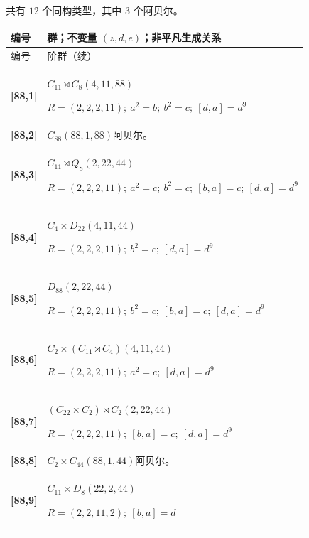 \documentclass[UTF8,fontset=fandol,11pt,a4paper]{ctexart}
\begin{document}
共有 $12$ 个同构类型，其中 $3$ 个阿贝尔。

\begingroup\small\setlength{\tabcolsep}{3pt}\renewcommand{\arraystretch}{1.12}

\begin{longtable}{@{}p{17mm}>{\raggedright\arraybackslash}p{141mm}@{}}

\toprule 编号 & 群；不变量 $(z,d,e)$；非平凡生成关系\\\midrule\endfirsthead

\toprule 编号 & 88 阶群（续）\\\midrule\endhead\bottomrule\endfoot

\textbf{[88,1]} & $C_{11}\rtimes C_{8}$\quad $(4,11,88)$\par\(R=(2,2,2,11);\allowbreak\ a^{2}=b;\allowbreak\ b^{2}=c;\allowbreak\ [d,a]=d^{9}\)\\[3pt]

\textbf{[88,2]} & $C_{88}$\quad $(88,1,88)$\quad 阿贝尔。\\[3pt]

\textbf{[88,3]} & $C_{11}\rtimes Q_{8}$\quad $(2,22,44)$\par\(R=(2,2,2,11);\allowbreak\ a^{2}=c;\allowbreak\ b^{2}=c;\allowbreak\ [b,a]=c;\allowbreak\ [d,a]=d^{9}\)\\[3pt]

\textbf{[88,4]} & $C_{4}\times D_{22}$\quad $(4,11,44)$\par\(R=(2,2,2,11);\allowbreak\ b^{2}=c;\allowbreak\ [d,a]=d^{9}\)\\[3pt]

\textbf{[88,5]} & $D_{88}$\quad $(2,22,44)$\par\(R=(2,2,2,11);\allowbreak\ b^{2}=c;\allowbreak\ [b,a]=c;\allowbreak\ [d,a]=d^{9}\)\\[3pt]

\textbf{[88,6]} & $C_{2}\times (C_{11}\rtimes C_{4})$\quad $(4,11,44)$\par\(R=(2,2,2,11);\allowbreak\ a^{2}=c;\allowbreak\ [d,a]=d^{9}\)\\[3pt]

\textbf{[88,7]} & $(C_{22}\times C_{2})\rtimes C_{2}$\quad $(2,22,44)$\par\(R=(2,2,2,11);\allowbreak\ [b,a]=c;\allowbreak\ [d,a]=d^{9}\)\\[3pt]

\textbf{[88,8]} & $C_{2}\times C_{44}$\quad $(88,1,44)$\quad 阿贝尔。\\[3pt]

\textbf{[88,9]} & $C_{11}\times D_{8}$\quad $(22,2,44)$\par\(R=(2,2,11,2);\allowbreak\ [b,a]=d\)\\[3pt]


\end{longtable}
\end{document}
